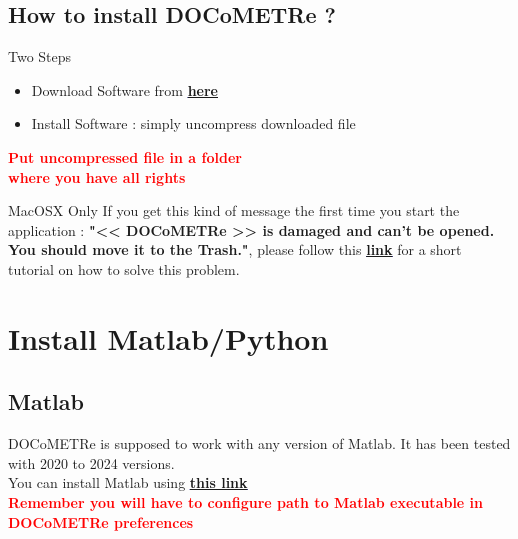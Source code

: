 \documentclass[a4paper,11pt]{beamer}
\begin{document}
\subsection{How to install DOCoMETRe ?}
\begin{frame}[containsverbatim]
\begin{block}{Two Steps}
    \begin{itemize}
        \item Download Software from \textcolor{blue}{\textbf{\underline{\href{https://fbuloup.github.io/DOCoMETRe/}{here}}}}
        \item Install Software : simply uncompress downloaded file
    \end{itemize}
\end{block}

\begin{alertblock}{}
    \centering
    \textcolor{red}{\textbf{Put uncompressed file in a folder}}\\
    \textcolor{red}{\textbf{where you have all rights}}
\end{alertblock}

\begin{alertblock}{MacOSX Only}
    \justifying
    If you get this kind of message the first time you start the application : \textbf{"<< DOCoMETRe >> is damaged and can't be opened. You should move it to the Trash."},
    please follow this \textcolor{blue}{\textbf{\underline{\href{https://github.com/fbuloup/DOCoMETRe/wiki/Note-for-OSX-users}{link}}}} for a short
    tutorial on how to solve this problem.
    
\end{alertblock}

\end{frame}

\section{Install Matlab/Python}
\subsection{Matlab}
\begin{frame}
\centering
DOCoMETRe is supposed to work with any version of Matlab. It has been tested with 2020 to 2024 versions.\\

You can install Matlab using \textcolor{blue}{\textbf{\underline{\href{https://fr.mathworks.com/academia/tah-portal/aix-marseille-universite-31651599.html}{this link}}}}\\
\vspace{1cm}
\centering
    \textcolor{red}{\textbf{Remember you will have to configure path to Matlab executable in DOCoMETRe preferences}}
\end{frame}
\end{document}
